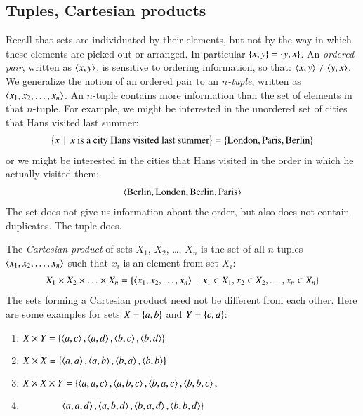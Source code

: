 \documentclass[nobib,nofonts]{tufte-handout}
\begin{document}
\subsection{Tuples, Cartesian products}

Recall that sets are individuated by their elements, but not by the way in which these elements
are picked out or arranged.
In particular $\left\{x,y\right\} = \left\{y,x\right\}$.
An \emph{ordered pair}, written as $\left \langle x,y\right\rangle$, is sensitive to ordering information, so that:
$\left \langle x,y\right\rangle \neq \left \langle y,x\right\rangle$.
We generalize the notion of an ordered pair to an \emph{$n$-tuple}, written as $\left \langle x_1, x_2, \dots, x_n\right\rangle$.
An $n$-tuple contains more information than the set of elements in that $n$-tuple. For example, we might be interested in the unordered set of cities that Hans visited last summer:
\begin{align*}
  \left\{x \thinspace \mid \thinspace \text{$x$ is a city Hans
      visited last summer}\right\} = \left\{\text{London}, \text{Paris}, \text{Berlin}\right\}
\end{align*}
or we might be interested in the cities that Hans visited in the order in
which he actually visited them:
\begin{align*}
  \left \langle \text{Berlin}, \text{London}, \text{Berlin}, \text{Paris}\right\rangle
\end{align*}
The set does not give us information about the order, but also does not contain duplicates.
The tuple does.


The \emph{Cartesian product} of sets $X_1$, $X_2$, \dots, $X_n$ is the set of all $n$-tuples
$\left \langle x_1, x_2, \dots, x_n\right\rangle$ such that $x_i$ is an element from set $X_i$:
\begin{align*}
  X_1 \times X_2 \times \ldots \times X_n  = \left\{\left \langle x_1, x_2,
  \dots, x_n\right\rangle \thinspace \mid \thinspace x_1 \in X_1, x_2 \in X_2, \dots, x_n \in X_n\right\}
\end{align*}
The sets forming a Cartesian product need not be different from each other.
Here are some examples for sets $X = \left\{a,b\right\}$ and $Y = \left\{c,d\right\}$:
\begin{enumerate}[]
  \item $X \times Y = \left\{\left \langle a,c\right\rangle, \left \langle a,d\right\rangle, \left \langle b,c\right\rangle, \left \langle b,d\right\rangle\right\}$
  \item $X \times X = \left\{\left \langle a,a\right\rangle, \left \langle a,b\right\rangle, \left \langle b,a\right\rangle, \left \langle b,b\right\rangle\right\}$
  \item $X \times X \times Y = \{\left \langle a,a,c\right\rangle, \left \langle a,b,c\right\rangle, \left \langle b,a,c\right\rangle, \left \langle b,b,c\right\rangle,$
    \item \ \ \ \ \ \ \ \ $\left \langle a,a,d\right\rangle, \left \langle a,b,d\right\rangle, \left \langle b,a,d\right\rangle, \left \langle b,b,d\right\rangle\}$
\end{enumerate}
\end{document}
